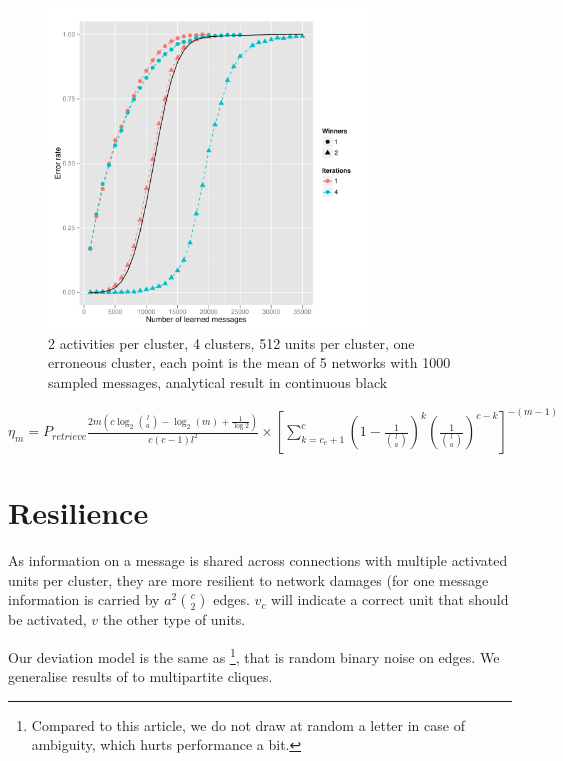 \documentclass[english,11pt,twocolumn]{article}
\theoremstyle{definition}
\begin{document}
	\begin{figure}[!htb]
		\includegraphics[width=8.5cm]{Courbes/remplacement_figure3g1}
		\caption{2 activities per cluster, 4 clusters, 512 units per cluster, one erroneous cluster, each point is the mean of 5 networks with 1000 sampled messages, analytical result in continuous black}
		\label{corruptth}
	\end{figure}
		
		$\eta_m = P_{retrieve}  \frac{2 m\left(c \log_2{l \choose a } - \log_2(m) + \frac{1}{\log 2} \right)}{c(c-1)l^2} \times \left [\sum_{k = c_e+1}^{c} \left (1-\frac{1}{{l \choose a}} \right )^k \left (\frac{1}{{l \choose a}} \right )^{c-k} \right ] ^{-(m-1)}$
		
		

	
	\section{Resilience}
	
	As information on a message is shared across connections with multiple activated units per cluster, they are more resilient to network damages (for one message information is carried by $a^2 {c \choose 2}$ edges. $v_c$ will indicate a correct unit that should be activated, $v$ the other type of units.
	
	Our deviation model is the same as \cite{LedGriRabGro20145}\footnote{Compared to this article, we do not draw at random a letter in case of ambiguity, which hurts performance a bit.}, that is random binary noise on edges. We generalise results of \cite{LedGriRabGro20145} to multipartite cliques.
	
\end{document}

